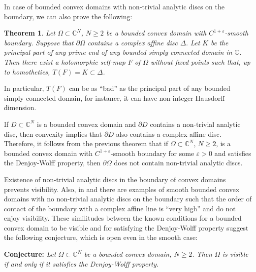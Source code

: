 \documentclass[12pt]{amsart}
\newtheorem{theorem}{Theorem}[section]
\theoremstyle{definition}
\theoremstyle{remark}
\numberwithin{equation}{section}
\def\C{\mathbb C}
\begin{document}
In case of bounded convex domains with non-trivial analytic discs on the boundary, we can also prove the following:

\begin{theorem}\label{prop:target-set-discs}
Let $\Omega\subset\C^N$, $N\geq 2$ be a bounded convex domain with $C^{1+\varepsilon}$-smooth boundary. Suppose that $\partial \Omega$ contains a complex affine disc {$\Delta$}. Let $K$ be the principal part of any prime end of any bounded simply connected domain in $\C$. Then there exist a holomorphic self-map $F$ of $\Omega$ without fixed points such that, up to homotheties, $T(F)=K \subset \Delta$.
 \end{theorem}
 
In particular, $T(F)$ can be as ``bad'' as the principal part of any bounded simply connected domain, for instance, it can have non-integer Hausdorff dimension. 
 
{If $D\subset \C^N$ is a bounded convex domain and $\partial D$ contains a non-trivial analytic disc, then convexity implies that $\partial D$ also contains a complex affine disc. Therefore}, it follows from the previous theorem that if $\Omega\subset \C^N$, $N\geq 2$, is  a bounded convex domain with $C^{1+\varepsilon}$-smooth boundary for some $\varepsilon>0$ and satisfies the Denjoy-Wolff property,  then $\partial \Omega$ does not contain non-trivial analytic discs. 

Existence of  non-trivial analytic discs in the boundary of convex domains prevents visibility. Also, in \cite[Section 5]{BNT} and \cite[Section 5]{Okt} there are examples of smooth bounded convex domains with no non-trivial analytic discs on the boundary such that the order of contact of the boundary  with a complex affine  line  is ``very high'' and do not enjoy visibility. These similitudes between the {known} conditions for a bounded convex domain to be visible and for satisfying the Denjoy-Wolff property suggest the following conjecture, which is open even in the smooth case:

\smallskip

{\bf Conjecture:} {\sl Let $\Omega\subset \C^N$ be a bounded convex domain, $N\geq 2$. Then $\Omega$ is visible if and only if it satisfies the Denjoy-Wolff property}.

\smallskip
\end{document}
